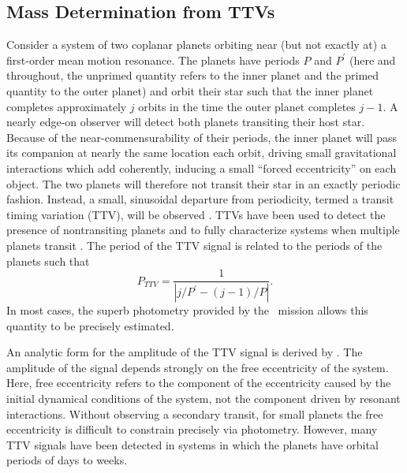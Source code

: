\subsection{Mass Determination from TTVs}

Consider a system of two coplanar planets orbiting near (but not exactly at) a first-order mean motion resonance. The planets have periods $P$ and $P^\prime$ (here and throughout, the unprimed quantity refers to the inner planet and the primed quantity to the outer planet) and orbit their star such that the inner planet completes approximately $j$ orbits in the time the outer planet completes $j-1$. A nearly edge-on observer will detect both planets transiting their host star. Because of the near-commensurability of their periods, the inner planet will pass its companion at nearly the same location each orbit, driving small gravitational interactions which add coherently, inducing a small “forced eccentricity” on each object. The two planets will therefore not transit their star in an exactly periodic fashion. Instead, a small, sinusoidal departure from periodicity, termed a transit timing variation (TTV), will be observed \citep[e.g.][]{Nesvorny12}. TTVs have been used to detect the presence of nontransiting planets \citep{Ballard11, Dawson12b} and to fully characterize systems when multiple planets transit \citep{Holman10, Lissauer11a}. The period of the TTV signal is related to the periods of the planets such that
\begin{equation}
P_{TTV} = \frac{1}{|j / P^\prime - (j-1) / P|}.
\end{equation}
In most cases, the superb photometry provided by the \kep\ mission allows this quantity to be precisely estimated. 

An analytic form for the amplitude of the TTV signal is derived by \citet[hereafter L12]{Lithwick12}. The amplitude of the signal depends strongly on the free eccentricity of the system. Here, free eccentricity refers to the component of the eccentricity caused by the initial dynamical conditions of the system, not the component driven by resonant interactions. Without observing a secondary transit, for small planets the free eccentricity is difficult to constrain precisely via photometry. However, many TTV signals have been detected in systems in which the planets have orbital periods of days to weeks. 

